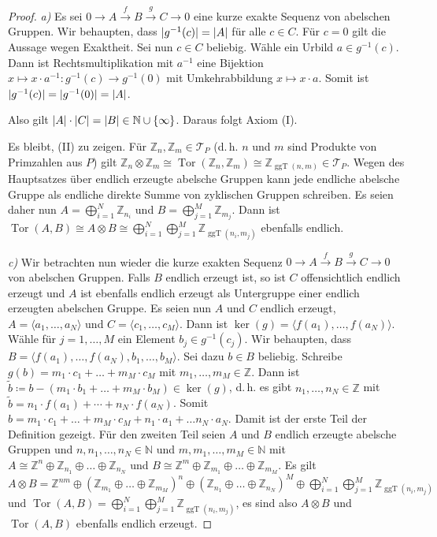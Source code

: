 \documentclass[11pt, a4paper, german]{article}
\theoremstyle{definition}
\theoremstyle{remark}
\newcommand{\N}{\mathbb{N}} %
\newcommand{\Z}{\mathbb{Z}} %
\newcommand{\angles}[1]{{\langle #1 \rangle}}
\DeclareMathOperator{\Tor}{Tor} %
\newcommand{\T}{\mathcal{T}} %
\DeclarePairedDelimiter\abs{\lvert}{\rvert} %
\DeclarePairedDelimiter\ord{\lvert}{\rvert} %
\DeclareMathOperator{\ggT}{ggT} %
\renewcommand{\dh}{d.\,h.} %
\begin{document}
\begin{proof}
  \emph{a)} \enspace Es sei $0 \to A \xrightarrow{f} B \xrightarrow{g} C \to 0$ eine kurze exakte Sequenz von abelschen Gruppen.
  Wir behaupten, dass $\abs{g^{-1}(c)} = \abs{A}$ für alle $c \in C$.
  Für $c = 0$ gilt die Aussage wegen Exaktheit.
  Sei nun $c \in C$ beliebig.
  Wähle ein Urbild $a \in g^{-1}(c)$.
  Dann ist Rechtsmultiplikation mit $a^{-1}$ eine Bijektion $x \mapsto x \cdot a^{-1} : g^{-1}(c) \to g^{-1}(0)$ mit Umkehrabbildung $x \mapsto x \cdot a$.
  Somit ist $\abs{g^{-1}(c)} = \abs{g^{-1}(0)} = \abs{A}$.
  
  Also gilt $\ord{A} \cdot \ord{C} = \ord{B} \in \N \cup \{ \infty \}$.
  Daraus folgt Axiom (I).
  
  Es bleibt, (II) zu zeigen.
  Für $\Z_n, \Z_m \in \T_P$ (\dh{} $n$ und $m$ sind Produkte von Primzahlen aus $P$) gilt $\Z_n \otimes \Z_m \cong \Tor(\Z_n, \Z_m) \cong \Z_{\ggT(n, m)} \in \T_P$.
  Wegen des Hauptsatzes über endlich erzeugte abelsche Gruppen kann jede endliche abelsche Gruppe als endliche direkte Summe von zyklischen Gruppen schreiben.
  Es seien daher nun $A = \bigoplus_{i=1}^N \Z_{n_i}$ und $B = \bigoplus_{j=1}^M \Z_{m_j}$.
  Dann ist $\Tor(A, B) \cong A \otimes B \cong \bigoplus_{i=1}^N \bigoplus_{j=1}^M \Z_{\ggT(n_i, m_j)}$ ebenfalls endlich.

  \emph{c)} \enspace Wir betrachten nun wieder die kurze exakten Sequenz $0 \to A \xrightarrow{f} B \xrightarrow{g} C \to 0$ von abelschen Gruppen.
  Falls $B$ endlich erzeugt ist, so ist $C$ offensichtlich endlich erzeugt und $A$ ist ebenfalls endlich erzeugt als Untergruppe einer endlich erzeugten abelschen Gruppe.
  Es seien nun $A$ und $C$ endlich erzeugt, $A = \angles{a_1, \ldots, a_N}$ und $C = \angles{c_1, \ldots, c_M}$.
  Dann ist $\ker(g) = \angles{f(a_1), \ldots, f(a_N)}$.
  Wähle für $j = 1, \ldots, M$ ein Element $b_j \in g^{-1}(c_j)$.
  Wir behaupten, dass $B = \angles{f(a_1), \ldots, f(a_N), b_1, \ldots, b_M}$.
  Sei dazu $b \in B$ beliebig.
  Schreibe $g(b) = m_1 \cdot c_1 + \ldots + m_M \cdot c_M$ mit $m_1, \ldots, m_M \in \Z$.
  Dann ist $\tilde{b} \coloneqq b - (m_1 \cdot b_1 + \ldots + m_M \cdot b_M) \in \ker(g)$, \dh{} es gibt $n_1, \ldots, n_N \in \Z$ mit $\tilde{b} = n_1 \cdot f(a_1) + \cdots + n_N \cdot f(a_N)$.
  Somit $b = m_1 \cdot c_1 + \ldots + m_M \cdot c_M + n_1 \cdot a_1 + \ldots n_N \cdot a_N$.
  Damit ist der erste Teil der Definition gezeigt.
  Für den zweiten Teil seien $A$ und $B$ endlich erzeugte abelsche Gruppen und $n, n_1, \ldots, n_N \in \N$ und $m, m_1, \ldots, m_M \in \N$ mit $A \cong \Z^n \oplus \Z_{n_1} \oplus \ldots \oplus \Z_{n_N}$ und $B \cong \Z^m \oplus \Z_{m_1} \oplus \ldots \oplus \Z_{m_M}$.
  Es gilt $A \otimes B = \Z^{nm} \oplus \left( \Z_{m_1} \oplus \ldots \oplus \Z_{m_M} \right)^n \oplus \left( \Z_{n_1} \oplus \ldots \oplus \Z_{n_N} \right)^M \oplus \bigoplus_{i=1}^N \bigoplus_{j=1}^M \Z_{\ggT(n_i, m_j)}$
  und $\Tor(A, B) = \bigoplus_{i=1}^N \bigoplus_{j=1}^M \Z_{\ggT(n_i, m_j)}$, es sind also $A \otimes B$ und $\Tor(A, B)$ ebenfalls endlich erzeugt.
\end{proof}
\end{document}
